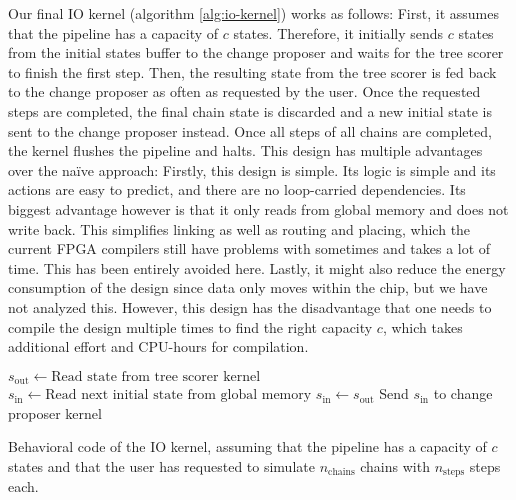 Our final IO kernel (algorithm \ref{alg:io-kernel}) works as follows: First, it assumes that the pipeline has a capacity of $c$ states. Therefore, it initially sends $c$ states from the initial states buffer to the change proposer and waits for the tree scorer to finish the first step. Then, the resulting state from the tree scorer is fed back to the change proposer as often as requested by the user. Once the requested steps are completed, the final chain state is discarded and a new initial state is sent to the change proposer instead. Once all steps of all chains are completed, the kernel flushes the pipeline and halts. This design has multiple advantages over the na\"ive approach: Firstly, this design is simple. Its logic is simple and its actions are easy to predict, and there are no loop-carried dependencies. Its biggest advantage however is that it only reads from global memory and does not write back. This simplifies linking as well as routing and placing, which the current \ac{FPGA} compilers still have problems with sometimes and takes a lot of time. This has been entirely avoided here. Lastly, it might also reduce the energy consumption of the design since data only moves within the chip, but we have not analyzed this. However, this design has the disadvantage that one needs to compile the design multiple times to find the right capacity $c$, which takes additional effort and \ac{CPU}-hours for compilation.

\begin{algorithm}
    \begin{algorithmic}
                \State $s_\mathrm{out} \leftarrow \text{Read state from tree scorer kernel}$
            \EndIf
                    \State $s_\mathrm{in} \leftarrow \text{Read next initial state from global memory}$
                \Else
                    \State $s_\mathrm{in} \leftarrow s_\mathrm{out}$
                \EndIf
                \State Send $s_\mathrm{in}$ to change proposer kernel
            \EndIf
        \EndFor
    \end{algorithmic}
    \caption{Behavioral code of the IO kernel, assuming that the pipeline has a capacity of $c$ states and that the user has requested to simulate $n_\mathrm{chains}$ chains with $n_\mathrm{steps}$ steps each.}
    \label{alg:io-kernel}
\end{algorithm}